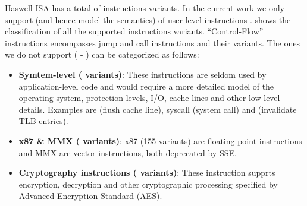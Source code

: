 Haswell \ISA ISA has   a total of \totalIS{} instructions variants. In the current work we only support (and hence model the semantics)
of \currentIS{}  user-level instructions .  shows the classification of all the supported instructions variants. ``Control-Flow'' instructions encompasses jump and call instructions and their variants.  The ones we do not support (\totalIS{} - \currentIS{})  can be categorized as
follows:
\begin{itemize}
    \item \textbf{Symtem-level (\system{} variants)}:  These instructions are seldom
    used by application-level code and would require a more detailed model of
    the operating system, protection levels, I/O, cache lines and other
    low-level details. Examples are  (flush cache line),
     syscall (system call) and
     (invalidate TLB entries).
    
    
    \item \textbf{x87 \& MMX (\Xmmx{} variants)}: x87 (155 variants) are
    floating-point instructions  and MMX are vector instructions,
    both deprecated by SSE.  
    
    \item \textbf{Cryptography instructions (\crypto{} variants)}: These instruction
    supprts encryption, decryption and other  cryptographic processing
    specified by Advanced Encryption Standard (AES). 
\end{itemize}


